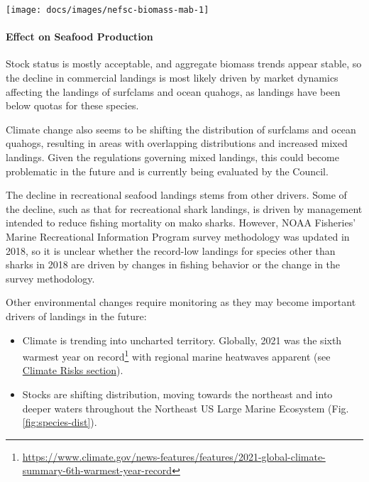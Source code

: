 \documentclass[
  10pt,
]{article}
\providecommand{\tightlist}{%
  \setlength{\itemsep}{0pt}\setlength{\parskip}{0pt}}
\let\origfigure\figure
\let\endorigfigure\endfigure
\renewenvironment{figure}[1][2] {
    \expandafter\origfigure\expandafter[H]
} {
    \endorigfigure
}
\begin{document}
\begin{figure}

{\centering \texttt{[image: docs/images/nefsc-biomass-mab-1]} 

}

\caption{Spring (left) and fall (right) surveyed biomass in the Mid-Atlantic Bight. Data from the NEFSC Bottom Trawl Survey are shown in black, with the nearshore NEAMAP survey shown in red. The shaded area around each annual mean represents 2 standard deviations from the mean.}\label{fig:nefsc-biomass-mab}
\end{figure}

\hypertarget{effect-on-seafood-production}{%
\paragraph{Effect on Seafood
Production}\label{effect-on-seafood-production}}

Stock status is mostly acceptable, and aggregate biomass trends appear
stable, so the decline in commercial landings is most likely driven by
market dynamics affecting the landings of surfclams and ocean quahogs,
as landings have been below quotas for these species.

Climate change also seems to be shifting the distribution of surfclams
and ocean quahogs, resulting in areas with overlapping distributions and
increased mixed landings. Given the regulations governing mixed
landings, this could become problematic in the future and is currently
being evaluated by the Council.

The decline in recreational seafood landings stems from other drivers.
Some of the decline, such as that for recreational shark landings, is
driven by management intended to reduce fishing mortality on mako
sharks. However, NOAA Fisheries' Marine Recreational Information Program
survey methodology was updated in 2018, so it is unclear whether the
record-low landings for species other than sharks in 2018 are driven by
changes in fishing behavior or the change in the survey methodology.

Other environmental changes require monitoring as they may become
important drivers of landings in the future:

\begin{itemize}
\tightlist
\item
  Climate is trending into uncharted territory. Globally, 2021 was the
  sixth warmest year on record\footnote{\url{https://www.climate.gov/news-features/features/2021-global-climate-summary-6th-warmest-year-record}}
  with regional marine heatwaves apparent (see
  \protect\hyperlink{climate-and-ecosystem-productivity}{Climate Risks
  section}).\\
\item
  Stocks are shifting distribution, moving towards the northeast and
  into deeper waters throughout the Northeast US Large Marine Ecosystem
  (Fig. \ref{fig:species-dist}).
\end{itemize}
\end{document}

